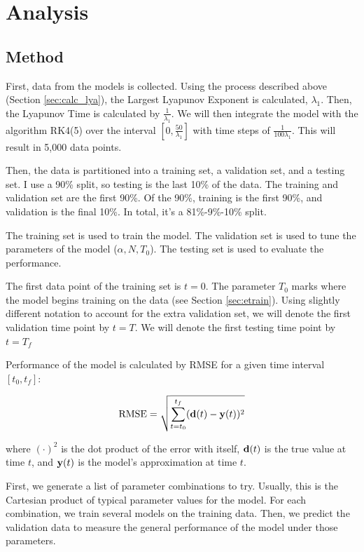 \documentclass{article}
\begin{document}
\section{Analysis}

\subsection{Method}

First, data from the models is collected. Using the process described above
(Section \ref{sec:calc_lya}), the Largest Lyapunov Exponent is calculated,
$\lambda_1$. Then, the Lyapunov Time is calculated by $\frac{1}{\lambda_1}$.
We will then integrate the model with the algorithm RK4(5) over the
interval $[0, \frac{50}{\lambda_1}]$ with time steps of $\frac{1}{100
\lambda_1}$. This will result in 5,000 data points.

Then, the data is partitioned into a training set, a validation set, and a
testing set. I use a 90\% split, so testing is the last 10\% of the data. The
training and validation set are the first 90\%. Of the 90\%, training is the
first 90\%, and validation is the final 10\%. In total, it's a 81\%-9\%-10\%
split.

The training set is used to train the model. The validation set is used to
tune the parameters of the model ($\alpha, N, T_0$). The testing set is used
to evaluate the performance.

The first data point of the training set is $t = 0$. The parameter $T_0$
marks where the model begins training on the data (see Section
\ref{sec:etrain}). Using slightly different notation to account for the extra
validation set, we will denote the first validation time point by $t = T$. We
will denote the first testing time point by $t = T_f$

Performance of the model is calculated by RMSE for a given time interval
$[t_0, t_f]$:

\begin{align}
    \text{RMSE} = \sqrt{\sum^{t_f}_{t=t_0} (\mathbf{d}(t) - \mathbf{y}(t))^2}
\end{align}

where $(\cdot)^2$ is the dot product of the error with itself, $\mathbf{d}(t)$ is
the true value at time $t$, and $\mathbf{y}(t)$ is the model's approximation at time
$t$.

First, we generate a list of parameter combinations to try. Usually, this is
the Cartesian product of typical parameter values for the model. For each
combination, we train several models on the training data. Then, we predict
the validation data to measure the general performance of the model under
those parameters.
\end{document}

